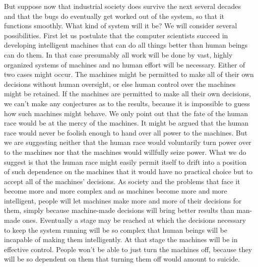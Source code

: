  But suppose now that industrial society does survive the next several decades and that the bugs do eventually get worked out of the system, so that it functions smoothly. What kind of system will it be? We will consider several possibilities.
 First let us postulate that the computer scientists succeed in developing intelligent machines that can do all things better than human beings can do them. In that case presumably all work will be done by vast, highly organized systems of machines and no human effort will be necessary. Either of two cases might occur. The machines might be permitted to make all of their own decisions without human oversight, or else human control over the machines might be retained.
 If the machines are permitted to make all their own decisions, we can’t make any conjectures as to the results, because it is impossible to guess how such machines might behave. We only point out that the fate of the human race would be at the mercy of the machines. It might be argued that the human race would never be foolish enough to hand over all power to the machines. But we are suggesting neither that the human race would voluntarily turn power over to the machines nor that the machines would willfully seize power. What we do suggest is that the human race might easily permit itself to drift into a position of such dependence on the machines that it would have no practical choice but to accept all of the machines’ decisions. As society and the problems that face it become more and more complex and as machines become more and more intelligent, people will let machines make more and more of their decisions for them, simply because machine-made decisions will bring better results than man-made ones. Eventually a stage may be reached at which the decisions necessary to keep the system running will be so complex that human beings will be incapable of making them intelligently. At that stage the machines will be in effective control. People won’t be able to just turn the machines off, because they will be so dependent on them that turning them off would amount to suicide.
